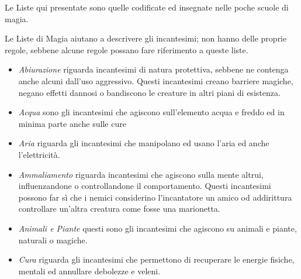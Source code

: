 \begin{multicols}{2}
Le Liste qui presentate sono quelle codificate ed insegnate nelle poche scuole di magia.


Le Liste di Magia aiutano a descrivere gli incantesimi; non hanno delle proprie regole, sebbene alcune regole possano fare riferimento a queste liste.

\begin{itemize}[leftmargin=*] \setlength{\itemsep}{0pt}
\item
\emph{Abiurazione} riguarda incantesimi di natura protettiva, sebbene ne contenga anche alcuni dall'uso aggressivo. Questi incantesimi creano barriere magiche, negano effetti dannosi o bandiscono le creature in altri piani di esistenza.

\item
\emph{Acqua} sono gli incantesimi che agiscono sull'elemento acqua e freddo ed in minima parte anche sulle cure

\item
\emph{Aria} riguarda gli incantesimi che manipolano ed usano l'aria ed anche l'elettricità.

\item
\emph{Ammaliamento} riguarda incantesimi che agiscono sulla mente altrui, influenzandone o controllandone il comportamento. Questi incantesimi possono far sì che i nemici considerino l'incantatore un amico od addirittura controllare un'altra creatura come fosse una marionetta.



\item
\emph{Animali e Piante} questi sono gli incantesimi che agiscono su animali e piante, naturali o magiche.

\item
\emph{Cura} riguarda gli incantesimi che permettono di recuperare le energie fisiche, mentali ed annullare debolezze e veleni.


\end{itemize}
\end{multicols}
